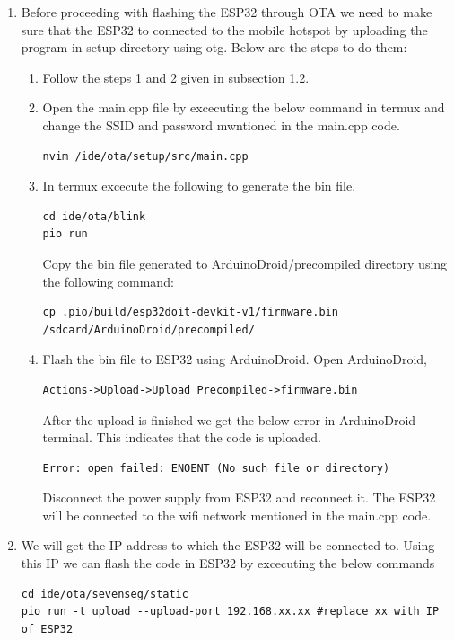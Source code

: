 \documentclass[journal]{IEEEtran}
\begin{document}
\begin{enumerate}
	\item Before proceeding with flashing the ESP32 through OTA we need to make sure that the ESP32 to connected to the mobile hotspot by uploading the program in setup directory using otg. Below are the steps to do them:
	\begin{enumerate}
	\item Follow the steps 1 and 2 given in subsection 1.2.
	\item Open the main.cpp file by excecuting the below command in termux and change the SSID and password mwntioned in the main.cpp code.
	\begin{lstlisting}
nvim /ide/ota/setup/src/main.cpp
	\end{lstlisting}
	\item In termux excecute the following to generate the bin file.
	\begin{lstlisting}
cd ide/ota/blink
pio run
	\end{lstlisting}
	Copy the bin file generated to ArduinoDroid/precompiled directory using the following command:
	\begin{lstlisting}
cp .pio/build/esp32doit-devkit-v1/firmware.bin /sdcard/ArduinoDroid/precompiled/
	\end{lstlisting}
	\item Flash the bin file to ESP32 using ArduinoDroid. Open ArduinoDroid, 
	\begin{lstlisting}
Actions->Upload->Upload Precompiled->firmware.bin
	\end{lstlisting}
	After the upload is finished we get the below error in ArduinoDroid terminal. This indicates that the code is uploaded.
	\begin{lstlisting}
Error: open failed: ENOENT (No such file or directory)
	\end{lstlisting}
	Disconnect the power supply from ESP32 and reconnect it. The ESP32 will be connected to the wifi network mentioned in the main.cpp code.
	\end{enumerate}
	\item We will get the IP address to which the ESP32 will be connected to. Using this IP we can flash the code in ESP32 by excecuting the below commands
	\begin{lstlisting}
cd ide/ota/sevenseg/static
pio run -t upload --upload-port 192.168.xx.xx #replace xx with IP of ESP32
	\end{lstlisting}
\end{enumerate}
\end{document}
